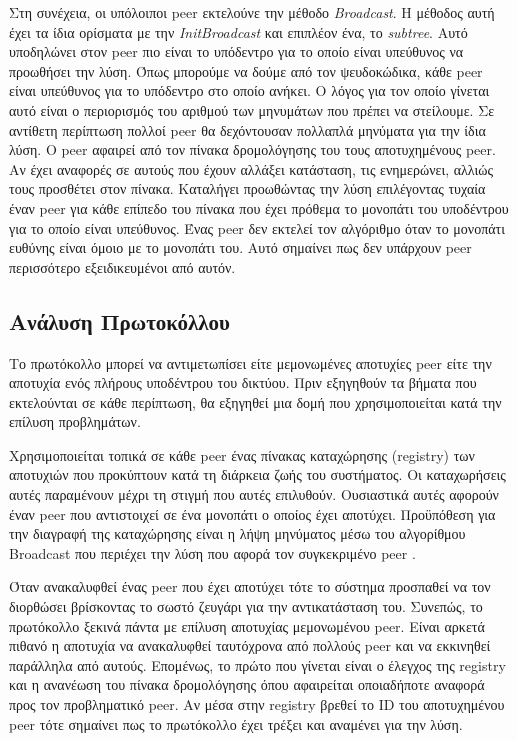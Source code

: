 Στη συνέχεια, οι υπόλοιποι peer εκτελούνε την μέθοδο \textit{Broadcast}. 
Η μέθοδος αυτή έχει τα ίδια ορίσματα με την \textit{InitBroadcast} και 
επιπλέον ένα, το \textit{subtree}. Αυτό υποδηλώνει στον peer πιο είναι το 
υπόδεντρο για το οποίο είναι υπεύθυνος να προωθήσει την λύση. Όπως μπορούμε 
να δούμε από τον ψευδοκώδικα, κάθε peer είναι υπεύθυνος για το υπόδεντρο στο 
οποίο ανήκει. Ο λόγος για τον οποίο γίνεται αυτό είναι ο περιορισμός του 
αριθμού των μηνυμάτων που πρέπει να στείλουμε. Σε αντίθετη περίπτωση πολλοί 
peer θα δεχόντουσαν πολλαπλά μηνύματα για την ίδια λύση. Ο peer αφαιρεί από 
τον πίνακα δρομολόγησης του τους αποτυχημένους peer. Αν έχει αναφορές σε 
αυτούς που έχουν αλλάξει κατάσταση, τις ενημερώνει, αλλιώς 
τους προσθέτει στον πίνακα. Καταλήγει προωθώντας την λύση επιλέγοντας τυχαία 
έναν peer για κάθε επίπεδο του πίνακα που έχει πρόθεμα το μονοπάτι του 
υποδέντρου για το οποίο είναι υπεύθυνος. Ένας peer δεν εκτελεί τον αλγόριθμο 
όταν το μονοπάτι ευθύνης είναι όμοιο με το μονοπάτι του. Αυτό σημαίνει πως 
δεν υπάρχουν peer περισσότερο εξειδικευμένοι από αυτόν.

\subsection{Ανάλυση Πρωτοκόλλου}

Το πρωτόκολλο μπορεί να αντιμετωπίσει είτε μεμονωμένες αποτυχίες peer είτε 
την αποτυχία ενός πλήρους υποδέντρου του δικτύου. Πριν εξηγηθούν τα βήματα 
που εκτελούνται σε κάθε περίπτωση, θα εξηγηθεί μια δομή που χρησιμοποιείται 
κατά την επίλυση προβλημάτων.

Χρησιμοποιείται τοπικά σε κάθε peer ένας πίνακας καταχώρησης (registry) των 
αποτυχιών που προκύπτουν κατά τη διάρκεια ζωής του συστήματος. Οι καταχωρήσεις 
αυτές παραμένουν μέχρι τη στιγμή που αυτές επιλυθούν. Ουσιαστικά αυτές αφορούν 
έναν peer που αντιστοιχεί σε ένα μονοπάτι ο οποίος έχει αποτύχει. 
Προϋπόθεση για την διαγραφή της καταχώρησης είναι η λήψη μηνύματος μέσω του 
αλγορίθμου Broadcast που περιέχει την λύση που αφορά τον συγκεκριμένο peer .

Όταν ανακαλυφθεί ένας peer που έχει αποτύχει τότε το σύστημα προσπαθεί να 
τον διορθώσει βρίσκοντας το σωστό ζευγάρι για την αντικατάσταση του. Συνεπώς, 
το πρωτόκολλο ξεκινά πάντα με επίλυση αποτυχίας μεμονωμένου peer. Είναι αρκετά 
πιθανό η αποτυχία να ανακαλυφθεί ταυτόχρονα από πολλούς peer και να εκκινηθεί 
παράλληλα από αυτούς. Επομένως, το πρώτο που γίνεται είναι ο έλεγχος της registry και 
η ανανέωση του πίνακα δρομολόγησης όπου αφαιρείται οποιαδήποτε αναφορά προς 
τον προβληματικό peer. Αν μέσα στην registry βρεθεί το ID του αποτυχημένου peer 
τότε σημαίνει πως το πρωτόκολλο έχει τρέξει και αναμένει για την λύση.

